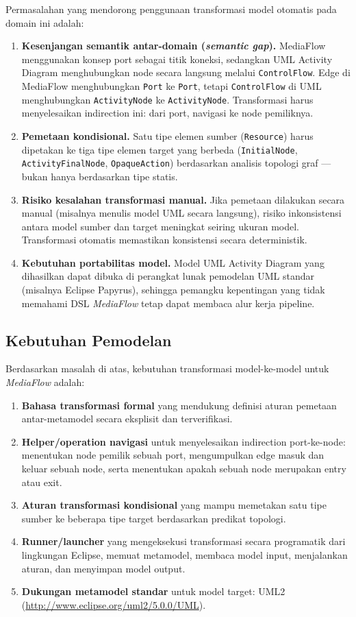 Permasalahan yang mendorong penggunaan transformasi model otomatis pada domain ini adalah:
\begin{enumerate}
  \item \textbf{Kesenjangan semantik antar-domain (\textit{semantic gap}).} MediaFlow menggunakan konsep port sebagai titik koneksi, sedangkan UML Activity Diagram menghubungkan node secara langsung melalui \texttt{ControlFlow}. Edge di MediaFlow menghubungkan \texttt{Port} ke \texttt{Port}, tetapi \texttt{ControlFlow} di UML menghubungkan \texttt{ActivityNode} ke \texttt{ActivityNode}. Transformasi harus menyelesaikan indirection ini: dari port, navigasi ke node pemiliknya.
  \item \textbf{Pemetaan kondisional.} Satu tipe elemen sumber (\texttt{Resource}) harus dipetakan ke tiga tipe elemen target yang berbeda (\texttt{InitialNode}, \texttt{ActivityFinalNode}, \texttt{OpaqueAction}) berdasarkan analisis topologi graf --- bukan hanya berdasarkan tipe statis.
  \item \textbf{Risiko kesalahan transformasi manual.} Jika pemetaan dilakukan secara manual (misalnya menulis model UML secara langsung), risiko inkonsistensi antara model sumber dan target meningkat seiring ukuran model. Transformasi otomatis memastikan konsistensi secara deterministik.
  \item \textbf{Kebutuhan portabilitas model.} Model UML Activity Diagram yang dihasilkan dapat dibuka di perangkat lunak pemodelan UML standar (misalnya Eclipse Papyrus), sehingga pemangku kepentingan yang tidak memahami DSL \textit{MediaFlow} tetap dapat membaca alur kerja pipeline.
\end{enumerate}

\subsection{Kebutuhan Pemodelan}

Berdasarkan masalah di atas, kebutuhan transformasi model-ke-model untuk \textit{MediaFlow} adalah:
\begin{enumerate}
  \item \textbf{Bahasa transformasi formal} yang mendukung definisi aturan pemetaan antar-metamodel secara eksplisit dan terverifikasi.
  \item \textbf{Helper/operation navigasi} untuk menyelesaikan indirection port-ke-node: menentukan node pemilik sebuah port, mengumpulkan edge masuk dan keluar sebuah node, serta menentukan apakah sebuah node merupakan entry atau exit.
  \item \textbf{Aturan transformasi kondisional} yang mampu memetakan satu tipe sumber ke beberapa tipe target berdasarkan predikat topologi.
  \item \textbf{Runner/launcher} yang mengeksekusi transformasi secara programatik dari lingkungan Eclipse, memuat metamodel, membaca model input, menjalankan aturan, dan menyimpan model output.
  \item \textbf{Dukungan metamodel standar} untuk model target: UML2 (\url{http://www.eclipse.org/uml2/5.0.0/UML}).
\end{enumerate}

